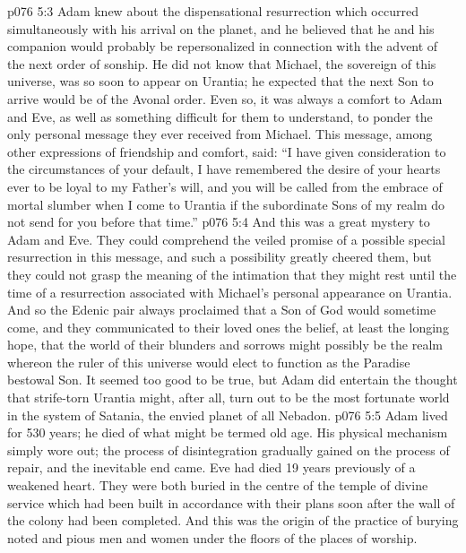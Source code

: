 \vs p076 5:3 \pc Adam knew about the dispensational resurrection which occurred simultaneously with his arrival on the planet, and he believed that he and his companion would probably be repersonalized in connection with the advent of the next order of sonship. He did not know that Michael, the sovereign of this universe, was so soon to appear on Urantia; he expected that the next Son to arrive would be of the Avonal order. Even so, it was always a comfort to Adam and Eve, as well as something difficult for them to understand, to ponder the only personal message they ever received from Michael. This message, among other expressions of friendship and comfort, said: “I have given consideration to the circumstances of your default, I have remembered the desire of your hearts ever to be loyal to my Father’s will, and you will be called from the embrace of mortal slumber when I come to Urantia if the subordinate Sons of my realm do not send for you before that time.”
\vs p076 5:4 And this was a great mystery to Adam and Eve. They could comprehend the veiled promise of a possible special resurrection in this message, and such a possibility greatly cheered them, but they could not grasp the meaning of the intimation that they might rest until the time of a resurrection associated with Michael’s personal appearance on Urantia. And so the Edenic pair always proclaimed that a Son of God would sometime come, and they communicated to their loved ones the belief, at least the longing hope, that the world of their blunders and sorrows might possibly be the realm whereon the ruler of this universe would elect to function as the Paradise bestowal Son. It seemed too good to be true, but Adam did entertain the thought that strife\hyp{}torn Urantia might, after all, turn out to be the most fortunate world in the system of Satania, the envied planet of all Nebadon.
\vs p076 5:5 \pc Adam lived for 530 years; he died of what might be termed old age. His physical mechanism simply wore out; the process of disintegration gradually gained on the process of repair, and the inevitable end came. Eve had died 19 years previously of a weakened heart. They were both buried in the centre of the temple of divine service which had been built in accordance with their plans soon after the wall of the colony had been completed. And this was the origin of the practice of burying noted and pious men and women under the floors of the places of worship.
